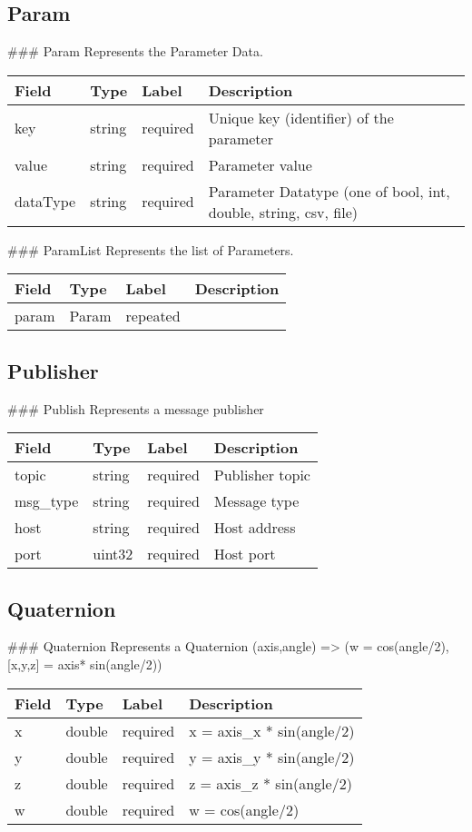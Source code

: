  \subsection{Param}\label{param.proto}

 \#\#\# Param Represents the Parameter Data.

\begin{longtable}[c]{@{}llll@{}}
\toprule
Field & Type & Label & Description\tabularnewline
\midrule
\endhead
key & string & required & Unique key (identifier) of the
parameter\tabularnewline
value & string & required & Parameter value\tabularnewline
dataType & string & required & Parameter Datatype (one of bool, int,
double, string, csv, file)\tabularnewline
\bottomrule
\end{longtable}

 \#\#\# ParamList Represents the list of Parameters.

\begin{longtable}[c]{@{}llll@{}}
\toprule
Field & Type & Label & Description\tabularnewline
\midrule
\endhead
param & Param & repeated &\tabularnewline
\bottomrule
\end{longtable}

\subsection{Publisher}\label{publish.proto}

 \#\#\# Publish Represents a message publisher

\begin{longtable}[c]{@{}llll@{}}
\toprule
Field & Type & Label & Description\tabularnewline
\midrule
\endhead
topic & string & required & Publisher topic\tabularnewline
msg\_type & string & required & Message type\tabularnewline
host & string & required & Host address\tabularnewline
port & uint32 & required & Host port\tabularnewline
\bottomrule
\end{longtable}

\subsection{Quaternion}\label{quaternion.proto}

 \#\#\# Quaternion Represents a Quaternion (axis,angle) =\textgreater{}
(w = cos(angle/2), {[}x,y,z{]} = axis* sin(angle/2))

\begin{longtable}[c]{@{}llll@{}}
\toprule
Field & Type & Label & Description\tabularnewline
\midrule
\endhead
x & double & required & x = axis\_x * sin(angle/2)\tabularnewline
y & double & required & y = axis\_y * sin(angle/2)\tabularnewline
z & double & required & z = axis\_z * sin(angle/2)\tabularnewline
w & double & required & w = cos(angle/2)\tabularnewline
\bottomrule
\end{longtable}

